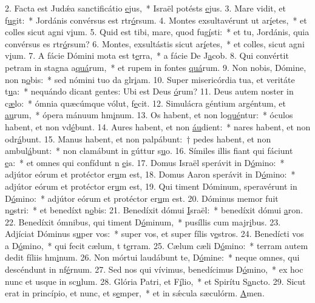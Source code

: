 2. Facta est Judǽa sanctificátio \uline{e}jus,~* Israël potésts \uline{e}jus.
3. Mare vidit, et f\uline{u}git:~* Jordánis convérsus est rtr\uline{ó}rsum.
4. Montes exsultavérunt ut ar\uline{í}etes,~* et colles sicut agni v\uline{i}um.
5. Quid est tibi, mare, quod fug\uline{í}sti:~* et tu, Jordánis, quia convérsus es rtr\uline{ó}rsum?
6. Montes, exsultástis sicut ar\uline{í}etes,~* et colles, sicut agni v\uline{i}um.
7. A fácie Dómini mota est t\uline{e}rra,~* a fácie De J\uline{a}cob.
8. Qui convértit petram in stagna a\uline{quá}rum,~* et rupem in fontes \uline{quá}rum.
9. Non nobis, Dómine, non n\uline{o}bis:~* sed nómini tuo da glr\uline{i}am.
10. Super misericórdia tua, et veritáte t\uline{u}a:~* nequándo dicant gentes: Ubi est Deus \uline{ó}rum?
11. Deus autem noster in c\uline{æ}lo:~* ómnia quæcúmque vólut, f\uline{e}cit.
12. Simulácra géntium argéntum, et \uline{au}rum,~* ópera mánuum hm\uline{i}num.
13. Os habent, et non lo\uline{qué}ntur:~* óculos habent, et non vd\uline{é}bunt.
14. Aures habent, et non \uline{áu}dient:~* nares habent, et non odr\uline{á}bunt.
15. Manus habent, et non palpábunt:~† pedes habent, et non ambul\uline{á}bunt:~* non clamábunt in gúttur s\uline{u}o.
16. Símiles illis fiant qui fáciunt \uline{e}a:~* et omnes qui confídunt n \uline{e}is.
17. Domus Israël sperávit in D\uline{ó}mino:~* adjútor eórum et protéctor er\uline{u}m est,
18. Domus Aaron sperávit in D\uline{ó}mino:~* adjútor eórum et protéctor er\uline{u}m est,
19. Qui timent Dóminum, speravérunt in D\uline{ó}mino:~* adjútor eórum et protéctor er\uline{u}m est.
20. Dóminus memor fuit n\uline{o}stri:~* et benedíxt n\uline{o}bis:
21. Benedíxit dómui \uline{I}sraël:~* benedíxit dómui \uline{a}ron.
22. Benedíxit ómnibus, qui timent D\uline{ó}minum,~* pusíllis cum majr\uline{i}bus.
23. Adjíciat Dóminus s\uline{u}per vos:~* super vos, et super fílis v\uline{e}stros.
24. Benedícti vos a D\uline{ó}mino,~* qui fecit cælum, t t\uline{e}rram.
25. Cælum cæli D\uline{ó}mino:~* terram autem dedit fíliis hm\uline{i}num.
26. Non mórtui laudábunt te, D\uline{ó}mine:~* neque omnes, qui descéndunt in nf\uline{é}rnum.
27. Sed nos qui vívimus, benedícimus D\uline{ó}mino,~* ex hoc nunc et usque in sc\uline{u}lum.
28. Glória Patri, et F\uline{í}lio,~* et Spirítu S\uline{a}ncto.
29. Sicut erat in princípio, et nunc, et s\uline{e}mper,~* et in sǽcula sæculórm. \uline{A}men.
